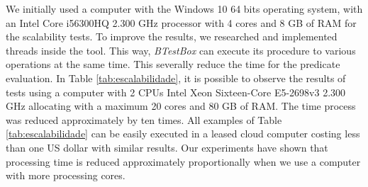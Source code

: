 \documentclass[runningheads]{llncs}
\begin{document}
We initially used a computer with the Windows 10 64 bits operating system, with an Intel Core i56300HQ 2.300 GHz processor with 4 cores and 8 GB of RAM for the scalability tests. %
%
To improve the results, we researched and implemented threads inside the tool.
This way, \textit{BTestBox} can execute its procedure to various operations at the same time.
This severally reduce the time for the predicate evaluation. In Table \ref{tab:escalabilidade}, it is possible to observe the results of tests using a computer with 2 CPUs Intel Xeon Sixteen-Core E5-2698v3 2.300 GHz allocating with a maximum 20 cores and 80 GB of RAM. The time process was reduced approximately by ten times.
All examples of Table \ref{tab:escalabilidade} can be easily executed in a leased cloud computer costing less than one US dollar with similar results.
Our experiments have shown that processing time is reduced approximately proportionally when we use a computer with more processing cores.


\end{document}
